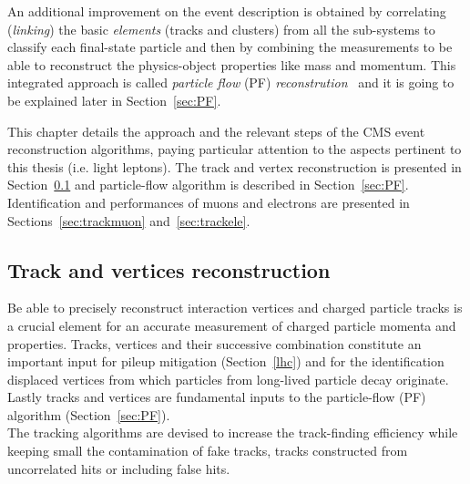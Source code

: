 An additional improvement on the event description is obtained by
correlating (\emph{linking}) the basic \emph{elements} (\ie tracks and
clusters) from all the sub-systems to classify each final-state
particle and then by combining the measurements to be able to
reconstruct the physics-object properties like mass and momentum. This
integrated approach is called \emph{particle flow} (PF)
\emph{reconstrution}~\cite{CMS:particleflow} and it is going to be
explained later in Section~\ref{sec:PF}.




This chapter details the approach and the relevant steps of the CMS
event reconstruction algorithms, paying particular attention to the
aspects pertinent to this thesis (i.e. light leptons). The track and vertex reconstruction 
is presented in Section~\ref{sec:trackvertex} and particle-flow
algorithm is described in Section~\ref{sec:PF}. Identification and
performances of muons and electrons are presented in
Sections~\ref{sec:trackmuon} and~\ref{sec:trackele}.


\subsection{Track and vertices reconstruction}\label{sec:trackvertex}

Be able to precisely reconstruct interaction vertices and charged
particle tracks is a crucial element for an accurate measurement of
charged particle momenta and properties. Tracks, vertices and their
successive combination constitute an important input for pileup
mitigation (Section~\ref{lhc}) and for the
identification displaced vertices from which particles from long-lived
particle decay originate.
Lastly tracks and vertices are fundamental inputs to the particle-flow (PF) algorithm (Section~\ref{sec:PF}).\\
The tracking algorithms are devised to
increase the track-finding efficiency while keeping small the
contamination of fake tracks, \ie tracks constructed from uncorrelated hits or
including false hits.\\
 
